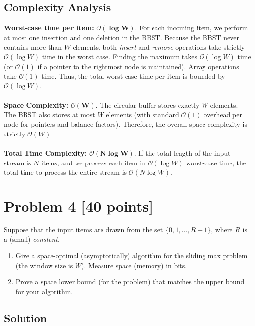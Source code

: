 \documentclass[11pt]{article}
\begin{document}
\subsection*{Complexity Analysis}


\textbf{Worst-case time per item:} $\mathbf{\mathcal{O}(\log W)}$. 
For each incoming item, we perform at most one insertion and one deletion in the BBST. Because the BBST never contains more than $W$ elements, both \textit{insert} and \textit{remove} operations take strictly $\mathcal{O}(\log W)$ time in the worst case. Finding the maximum takes $\mathcal{O}(\log W)$ time (or $\mathcal{O}(1)$ if a pointer to the rightmost node is maintained). Array operations take $\mathcal{O}(1)$ time. Thus, the total worst-case time per item is bounded by $\mathcal{O}(\log W)$.\\ \\ 
\textbf{Space Complexity:} $\mathbf{\mathcal{O}(W)}$. 
The circular buffer stores exactly $W$ elements. The BBST also stores at most $W$ elements (with standard $\mathcal{O}(1)$ overhead per node for pointers and balance factors). Therefore, the overall space complexity is strictly $\mathcal{O}(W)$.\\ \\
\textbf{Total Time Complexity:} $\mathbf{\mathcal{O}(N \log W)}$. 
    If the total length of the input stream is $N$ items, and we process each item in $\mathcal{O}(\log W)$ worst-case time, the total time to process the entire stream is $\mathcal{O}(N \log W)$.


\newpage
\section*{Problem 4 [40 points]}

Suppose that the input items are drawn from the set $\{ 0, 1, \ldots, R-1 \}$, where $R$ is a (small) \emph{constant}.
\begin{enumerate}[\ (1)]
\item
Give a space-optimal (asymptotically) algorithm for the sliding max problem (the window size is $W$). Measure space (memory) in bits.
\item
Prove a space lower bound (for the problem) that matches the upper bound for your algorithm.
\end{enumerate}

\subsection*{Solution}
\end{document}
